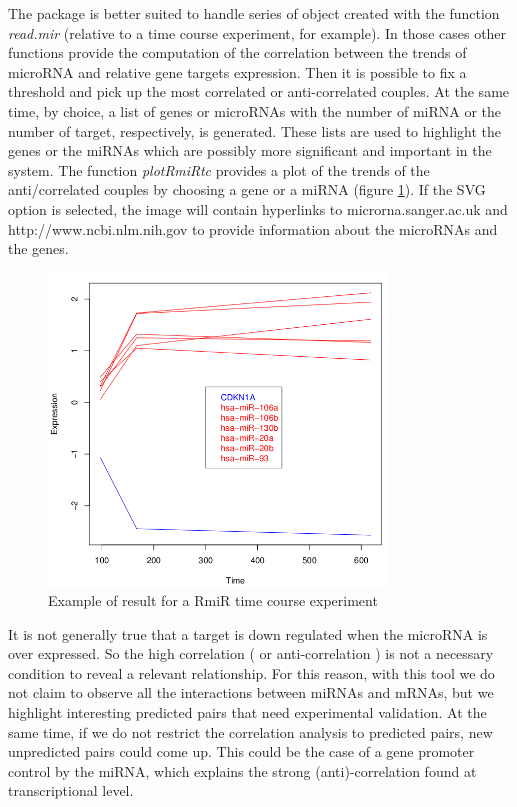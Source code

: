\documentclass{bioinfo}
\begin{document}
\begin{application}
\par The package is better suited to handle series of object created with the function \textit{read.mir} (relative to a time course experiment, for example). In those cases other functions provide the computation of the correlation between the trends of microRNA and relative gene targets expression. Then it is possible to fix a threshold and pick up the most correlated or anti-correlated couples. At the same time, by choice,  a list of genes or microRNAs with the number of miRNA or the number of target, respectively, is generated. These lists are used to highlight the genes or the miRNAs which are possibly more significant and important in the system. The function \textit{plotRmiRtc} provides a plot of the trends of the anti/correlated couples by choosing a gene or a miRNA (figure \ref{fig:01}). If the SVG option is selected, the image will contain hyperlinks to microrna.sanger.ac.uk and http://www.ncbi.nlm.nih.gov to provide information about the microRNAs and the genes.

\begin{figure}[!tpb]
\centerline{\includegraphics[width=9cm]{cdkn1a.png}}
\caption{Example of result for a RmiR time course experiment}\label{fig:01}
\end{figure}

\par It is not generally true that a target is down regulated when the microRNA is over expressed. So the high correlation ( or anti-correlation ) is not a necessary condition to reveal a relevant relationship. For this reason, with this tool we do not claim to observe all the interactions between miRNAs and mRNAs, but we highlight interesting predicted pairs that need experimental validation. At the same time, if we do not restrict the correlation analysis to predicted pairs, new unpredicted pairs could come up. This could be the case of a gene promoter control by the miRNA, which explains the strong (anti)-correlation found at transcriptional level.







\end{application}
\end{document}

